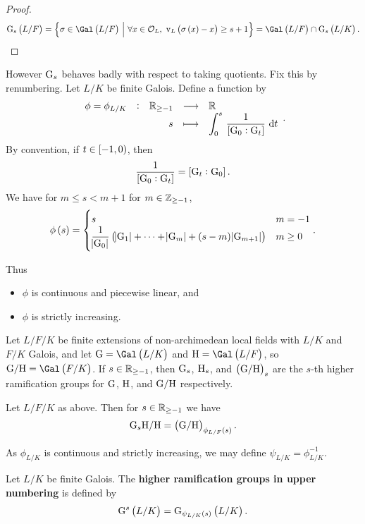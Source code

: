 \begin{proof}
$$ \G_s\br{L / F} = \cbr{\sigma \in \Gal\br{L / F} \st \forall x \in \OOO_L, \ \v_L\br{\sigma\br{x} - x} \ge s + 1} = \Gal\br{L / F} \cap \G_s\br{L / K}. $$
\end{proof}

However $ \mathrm{G}_s $ behaves badly with respect to taking quotients. Fix this by renumbering. Let $ L / K $ be finite Galois. Define a function by
$$ \function[\phi = \phi_{L / K}]{\RR_{\ge -1}}{\RR}{s}{\intd{0}{s}{\dfrac{1}{\sbr{\G_0 : \G_t}}}{t}}. $$
By convention, if $ t \in \intco{-1, 0} $, then
$$ \dfrac{1}{\sbr{\G_0 : \G_t}} = \sbr{\G_t : \G_0}. $$
We have for $ m \le s < m + 1 $ for $ m \in \mathbb{Z}_{\ge -1} $,
$$ \phi\br{s} =
\begin{cases}
s & m = -1 \\
\dfrac{1}{\abs{\G_0}}\br{\abs{\G_1} + \dots + \abs{\G_m} + \br{s - m}\abs{\G_{m + 1}}} & m \ge 0
\end{cases}.
$$

\pagebreak

Thus
\begin{itemize}
\item $ \phi $ is continuous and piecewise linear, and
\item $ \phi $ is strictly increasing.
\end{itemize}

\begin{notation*}
Let $ L / F / K $ be finite extensions of non-archimedean local fields with $ L / K $ and $ F / K $ Galois, and let $ \G = \Gal\br{L / K} $ and $ \H = \Gal\br{L / F} $, so $ \G / \H = \Gal\br{F / K} $. If $ s \in \mathbb{R}_{\ge -1} $, then $ \mathrm{G}_s $, $ \mathrm{H}_s $, and $ \br{\G / \H}_s $ are the $ s $-th higher ramification groups for $ \mathrm{G} $, $ \mathrm{H} $, and $ \mathrm{G} / \mathrm{H} $ respectively.
\end{notation*}

\begin{theorem}
\label{thm:16.4}
Let $ L / F / K $ as above. Then for $ s \in \mathbb{R}_{\ge -1} $ we have
$$ \G_s\H / \H = \br{\G / \H}_{\phi_{L / F}\br{s}}. $$
\end{theorem}

As $ \phi_{L / K} $ is continuous and strictly increasing, we may define $ \psi_{L / K} = \phi_{L / K}^{-1} $.

\begin{definition}
Let $ L / K $ be finite Galois. The \textbf{higher ramification groups in upper numbering} is defined by
$$ \G^s\br{L / K} = \G_{\psi_{L / K}\br{s}}\br{L / K}. $$
\end{definition}

